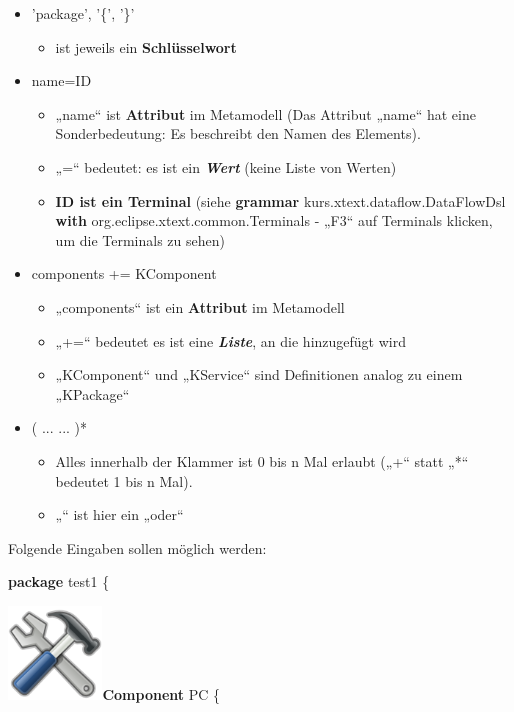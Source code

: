 \documentclass[]{article}
\providecommand{\tightlist}{%
  \setlength{\itemsep}{0pt}\setlength{\parskip}{0pt}}
\begin{document}
\begin{itemize}
\item
  'package', '\{', '\}'

  \begin{itemize}
  \tightlist
  \item
    ist jeweils ein \textbf{Schlüsselwort}
  \end{itemize}
\item
  name=ID

  \begin{itemize}
  \tightlist
  \item
    „name`` ist \textbf{Attribut }im Metamodell (Das Attribut „name``
    hat eine Sonderbedeutung: Es beschreibt den Namen des Elements).
  \item
    „=`` bedeutet: es ist ein \emph{\textbf{Wert}}\textbf{ }(keine Liste
    von Werten)
  \item
    \textbf{ID ist ein Terminal} (siehe \textbf{grammar}
    kurs.xtext.dataflow.DataFlowDsl \textbf{with}
    org.eclipse.xtext.common.Terminals - „F3`` auf Terminals klicken, um
    die Terminals zu sehen)
  \end{itemize}
\item
  components += KComponent

  \begin{itemize}
  \tightlist
  \item
    „components`` ist ein \textbf{Attribut }im Metamodell
  \item
    „+=`` bedeutet es ist eine \emph{\textbf{Liste}}, an die hinzugefügt
    wird
  \item
    „KComponent`` und „KService`` sind Definitionen analog zu einem
    „KPackage`` 
  \end{itemize}
\item
  ( ... \textbar{} ... )*

  \begin{itemize}
  \tightlist
  \item
    Alles innerhalb der Klammer ist 0 bis n Mal erlaubt („+`` statt „*``
    bedeutet 1 bis n Mal).
  \item
    „\textbar{}`` ist hier ein „oder``
  \end{itemize}
\end{itemize}

Folgende Eingaben sollen möglich werden:

\textbf{package} test1 \{

\includegraphics[width=0.98350in,height=0.98350in]{./Pictures/1000020100000080000000807EA91CDFA7B7F397.png}\textbf{Component}
PC \{
\end{document}
